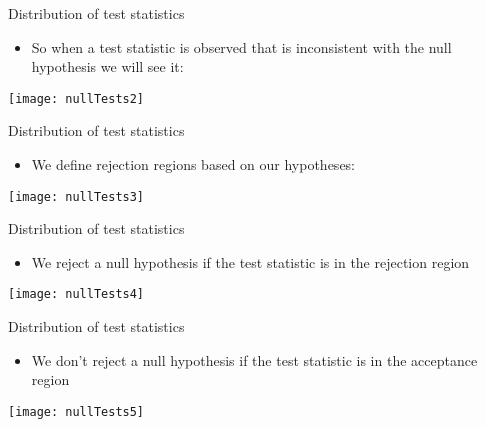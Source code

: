 \documentclass[xcolor=dvipsnames]{beamer}
\begin{document}
\begin{frame}{Distribution of test statistics}
	\begin{itemize}
		\item So when a test statistic is observed that is inconsistent with the null hypothesis we will see it:
	\end{itemize}
	\begin{center}
		\texttt{[image: nullTests2]}
	\end{center}
\end{frame}

\begin{frame}{Distribution of test statistics}
	\begin{itemize}
		\item We define rejection regions based on our hypotheses:
	\end{itemize}
	\begin{center}
		\texttt{[image: nullTests3]}
	\end{center}
\end{frame}

\begin{frame}{Distribution of test statistics}
	\begin{itemize}
		\item We reject a null hypothesis if the test statistic is in the rejection region
	\end{itemize}
	\begin{center}
		\texttt{[image: nullTests4]}
	\end{center}
\end{frame}

\begin{frame}{Distribution of test statistics}
	\begin{itemize}
		\item We don't reject a null hypothesis if the test statistic is in the acceptance region
	\end{itemize}
	\begin{center}
		\texttt{[image: nullTests5]}
	\end{center}
\end{frame}
\end{document}
